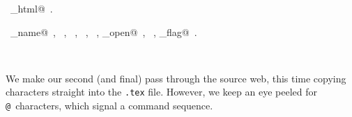 \documentclass{report}
\begin{document}
\begin{flushleft}
\begin{minipage}{\linewidth}
\begin{list}{}{\setlength{\itemsep}{-\parsep}\setlength{\itemindent}{-\leftmargin}}
\end{list}
\vspace{-2ex}
\footnotesize\addtolength{\baselineskip}{-1ex}
\begin{list}{}{\setlength{\itemsep}{-\parsep}\setlength{\itemindent}{-\leftmargin}}
\item \NWtxtIdentsDefed\nobreak\  \verb@write_html@\nobreak\ .\end{list}
\vspace{-2ex}
\footnotesize\addtolength{\baselineskip}{-1ex}
\begin{list}{}{\setlength{\itemsep}{-\parsep}\setlength{\itemindent}{-\leftmargin}}
\item \NWtxtIdentsUsed\nobreak\  \verb@command_name@\nobreak\ , \verb@fclose@\nobreak\ , \verb@FILE@\nobreak\ , \verb@fopen@\nobreak\ , \verb@fprintf@\nobreak\ , \verb@source_open@\nobreak\ , \verb@stderr@\nobreak\ , \verb@verbose_flag@\nobreak\ .\end{list}
\end{minipage}\\[4ex]
\end{flushleft}
We make our second (and final) pass through the source web, this time
copying characters straight into the \verb|.tex| file. However, we keep
an eye peeled for \verb|@|~characters, which signal a command sequence.
\end{document}
